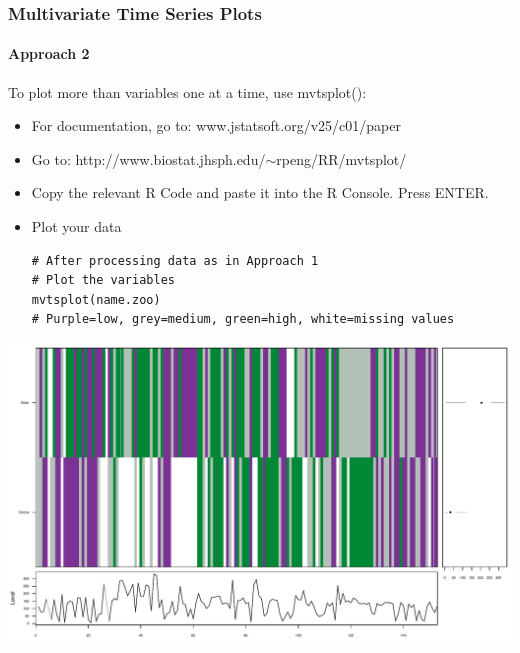 \begin{frame}
 \frametitle{Multivariate Time Series Plots}
 \framesubtitle{Approach 2}

To plot more than variables one at a time, use \ttfamily mvtsplot(): \normalfont
\begin{itemize}
	\item For documentation, go to: www.jstatsoft.org/v25/c01/paper 
	\item Go to: http://www.biostat.jhsph.edu/$\sim$rpeng/RR/mvtsplot/
	\item Copy the relevant R Code and paste it into the R Console. Press ENTER.
	\item Plot your data
		\begin{lstlisting}
# After processing data as in Approach 1
# Plot the variables
mvtsplot(name.zoo)
# Purple=low, grey=medium, green=high, white=missing values
		\end{lstlisting}
 \end{itemize}

       \begin{center}
         \includegraphics[width=1\textwidth]{images/Mtvsplot2.pdf}
        \end{center}
\end{frame}

